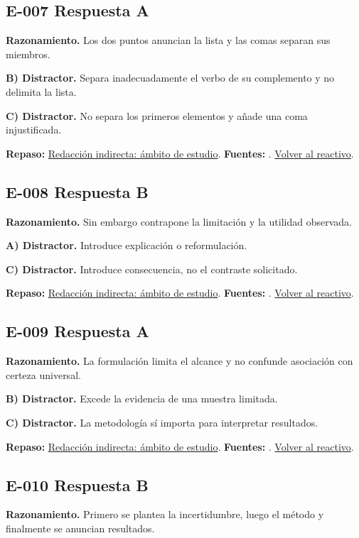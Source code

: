 \subsection*{E-007 \quad Respuesta A}\label{s:E-007}
\textbf{Razonamiento.} Los dos puntos anuncian la lista y las comas separan sus miembros.

\textbf{B) Distractor. }Separa inadecuadamente el verbo de su complemento y no delimita la lista.

\textbf{C) Distractor. }No separa los primeros elementos y añade una coma injustificada.

\textbf{Repaso:} \hyperref[sec:e1]{Redacción indirecta: ámbito de estudio}. \textbf{Fuentes:} \cite{rae,writing}. \hyperref[q:E-007]{Volver al reactivo}.\par\medskip

\subsection*{E-008 \quad Respuesta B}\label{s:E-008}
\textbf{Razonamiento.} Sin embargo contrapone la limitación y la utilidad observada.

\textbf{A) Distractor. }Introduce explicación o reformulación.

\textbf{C) Distractor. }Introduce consecuencia, no el contraste solicitado.

\textbf{Repaso:} \hyperref[sec:e1]{Redacción indirecta: ámbito de estudio}. \textbf{Fuentes:} \cite{rae,writing}. \hyperref[q:E-008]{Volver al reactivo}.\par\medskip

\subsection*{E-009 \quad Respuesta A}\label{s:E-009}
\textbf{Razonamiento.} La formulación limita el alcance y no confunde asociación con certeza universal.

\textbf{B) Distractor. }Excede la evidencia de una muestra limitada.

\textbf{C) Distractor. }La metodología sí importa para interpretar resultados.

\textbf{Repaso:} \hyperref[sec:e1]{Redacción indirecta: ámbito de estudio}. \textbf{Fuentes:} \cite{rae,writing}. \hyperref[q:E-009]{Volver al reactivo}.\par\medskip

\subsection*{E-010 \quad Respuesta B}\label{s:E-010}
\textbf{Razonamiento.} Primero se plantea la incertidumbre, luego el método y finalmente se anuncian resultados.


